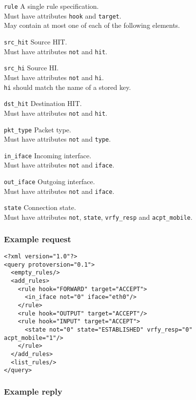 \documentclass[a4paper,titlepage]{article}
\begin{document}
\begin{description}
\item \texttt{rule} A single rule specification. \\
	Must have attributes \texttt{hook} and \texttt{target}. \\
	May contain at most one of each of the following elements.
\item \texttt{src\_hit} Source HIT. \\
	Must have attributes \texttt{not} and \texttt{hit}.
\item \texttt{src\_hi} Source HI. \\
	Must have attributes \texttt{not} and \texttt{hi}. \\
	\texttt{hi} should match the name of a stored key.
\item \texttt{dst\_hit} Destination HIT. \\
	Must have attributes \texttt{not} and \texttt{hit}.
\item \texttt{pkt\_type} Packet type. \\
	Must have attributes \texttt{not} and \texttt{type}.
\item \texttt{in\_iface} Incoming interface. \\
	Must have attributes \texttt{not} and \texttt{iface}.
\item \texttt{out\_iface} Outgoing interface. \\
	Must have attributes \texttt{not} and \texttt{iface}.
\item \texttt{state} Connection state. \\
	Must have attributes \texttt{not}, \texttt{state}, \texttt{vrfy\_resp} and \texttt{acpt\_mobile}.
\end{description}

\subsubsection*{Example request}

\begin{verbatim}
<?xml version="1.0"?>
<query protoversion="0.1">
  <empty_rules/>
  <add_rules>
    <rule hook="FORWARD" target="ACCEPT">
      <in_iface not="0" iface="eth0"/>
    </rule>
    <rule hook="OUTPUT" target="ACCEPT"/>
    <rule hook="INPUT" target="ACCEPT">
      <state not="0" state="ESTABLISHED" vrfy_resp="0" acpt_mobile="1"/>
    </rule>
  </add_rules>
  <list_rules/>
</query>
\end{verbatim}

\subsubsection*{Example reply}
\end{document}
